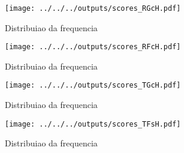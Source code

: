 \begin{frame}
  \frametitle{}
    
\end{frame}

\begin{figure}[H]
  \begin{center}
    \texttt{[image: ../../../outputs/scores\_RGcH.pdf]}
  \end{center}
  \caption{Distribuiao da frequencia}
\end{figure}

\begin{figure}[H]
  \begin{center}
    \texttt{[image: ../../../outputs/scores\_RFcH.pdf]}
  \end{center}
  \caption{Distribuiao da frequencia}
\end{figure}

\begin{figure}[H]
  \begin{center}
    \texttt{[image: ../../../outputs/scores\_TGcH.pdf]}
  \end{center}
  \caption{Distribuiao da frequencia}
\end{figure}

\begin{figure}[H]
  \begin{center}
    \texttt{[image: ../../../outputs/scores\_TFsH.pdf]}
  \end{center}
  \caption{Distribuiao da frequencia}
\end{figure}

